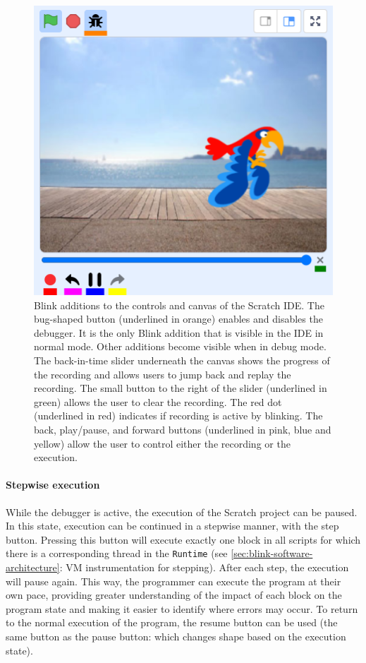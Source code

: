 \documentclass[../main]{subfiles}
\begin{document}
\begin{figure}
    \centering
    \includegraphics[width=\textwidth]{scratch-debugger-ide}
    \caption{
        Blink additions to the controls and canvas of the Scratch IDE.
        The bug-shaped button (underlined in orange) enables and disables the debugger.
        It is the only Blink addition that is visible in the IDE in normal mode.
        Other additions become visible when in debug mode.
        The back-in-time slider underneath the canvas shows the progress of the recording and allows users to jump back and replay the recording.
        The small button to the right of the slider (underlined in green) allows the user to clear the recording.
        The red dot (underlined in red) indicates if recording is active by blinking.
        The back, play/pause, and forward buttons (underlined in pink, blue and yellow) allow the user to control either the recording or the execution.
    }
    \label{fig:blink-ide}
\end{figure}

\paragraph{Stepwise execution}
While the debugger is active, the execution of the Scratch project can be paused.
In this state, execution can be continued in a stepwise manner, with the step button.
Pressing this button will execute exactly one block in all scripts for which there is a corresponding thread in the \texttt{Runtime} (see \vref{sec:blink-software-architecture}: VM instrumentation for stepping).
After each step, the execution will pause again.
This way, the programmer can execute the program at their own pace, providing greater understanding of the impact of each block on the program state and making it easier to identify where errors may occur.
To return to the normal execution of the program, the resume button can be used (the same button as the pause button: which changes shape based on the execution state).
\end{document}
